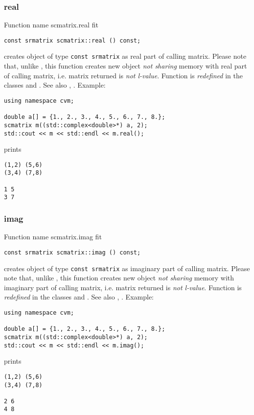 \subsubsection{real}
Function%
\pdfdest name {scmatrix.real} fit
\begin{verbatim}
const srmatrix scmatrix::real () const;
\end{verbatim}
creates  object of type \verb"const srmatrix"
as  real part
of  calling matrix.
Please note that, unlike
, this
function creates new object \emph{not sharing}  memory
with  real part of  calling matrix, i.e.
 matrix returned is \emph{not  l-value}.
Function is \emph{redefined} in the classes
 and
.
See also
,
.
Example:
\begin{Verbatim}
using namespace cvm;

double a[] = {1., 2., 3., 4., 5., 6., 7., 8.};
scmatrix m((std::complex<double>*) a, 2);
std::cout << m << std::endl << m.real();
\end{Verbatim}
prints
\begin{Verbatim}
(1,2) (5,6)
(3,4) (7,8)

1 5
3 7
\end{Verbatim}
\newpage




\subsubsection{imag}
Function%
\pdfdest name {scmatrix.imag} fit
\begin{verbatim}
const srmatrix scmatrix::imag () const;
\end{verbatim}
creates  object of type \verb"const srmatrix"
as  imaginary part
of  calling matrix.
Please note that, unlike
, this
function creates new object \emph{not sharing}  memory
with  imaginary part of  calling matrix, i.e.
 matrix returned is \emph{not  l-value}.
Function is \emph{redefined} in the classes
 and
.
See also
,
.
Example:
\begin{Verbatim}
using namespace cvm;

double a[] = {1., 2., 3., 4., 5., 6., 7., 8.};
scmatrix m((std::complex<double>*) a, 2);
std::cout << m << std::endl << m.imag();
\end{Verbatim}
prints
\begin{Verbatim}
(1,2) (5,6)
(3,4) (7,8)

2 6
4 8
\end{Verbatim}
\newpage




